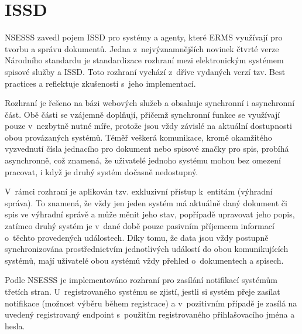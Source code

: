 \documentclass[
  master,
  field=ainfp,
  biblatex,
  language=czech,
  glossaries,
  theorems=false,
  index
]{kidiplom}
\begin{document}
\newpage
\section{ISSD}


\gls{NSESSS} zavedl pojem \gls{ISSD} pro systémy a agenty, které ERMS využívají pro tvorbu a správu dokumentů. Jedna z~nejvýznamnějších novinek čtvrté verze Národního standardu je standardizace rozhraní mezi elektronickým systémem spisové služby a ISSD. Toto rozhraní vychází z~dříve vydaných verzí tzv. Best practices\cite{o01} a reflektuje zkušenosti s~jeho implementací.

Rozhraní je řešeno na bázi webových služeb a obsahuje synchronní i asynchronní část\cite[s.~58]{o00}. Obě části se vzájemně doplňují, přičemž synchronní funkce se využívají pouze v~nezbytně nutné míře, protože jsou vždy závislé na aktuální dostupnosti obou provázaných systémů. Téměř veškerá komunikace, kromě okamžitého vyzvednutí čísla jednacího pro dokument nebo spisové značky pro spis, probíhá asynchronně, což znamená, že uživatelé jednoho systému mohou bez omezení pracovat, i když je druhý systém dočasně nedostupný.

V~rámci rozhraní je aplikován tzv. exkluzivní přístup k~entitám (výhradní správa). To znamená, že vždy jen jeden systém má aktuálně daný dokument či spis ve výhradní správě a může měnit jeho stav, popřípadě upravovat jeho popis, zatímco druhý systém je v~dané době pouze pasivním příjemcem informací o~těchto provedených událostech. Díky tomu, že data jsou vždy postupně synchronizována prostřednictvím jednotlivých událostí do obou komunikujících systémů, mají uživatelé obou systémů vždy přehled o~dokumentech a spisech.

Podle NSESSS je implementováno rozhraní pro zasílání notifikací systémům třetích stran. U~registrovaného systému se zjistí, jestli si systém přeje zasílat notifikace (možnost výběru během registrace) a v~pozitivním případě je zasílá na uvedený registrovaný endpoint s~použitím registrovaného přihlašovacího jména a hesla. 
\end{document}

